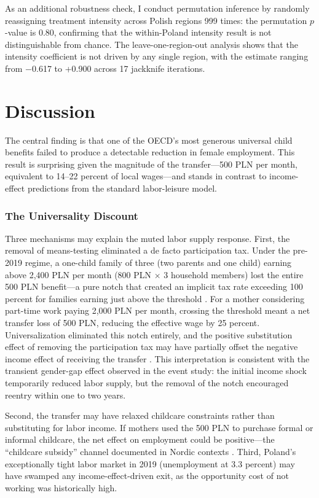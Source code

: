 \documentclass[12pt]{article}
\begin{document}
As an additional robustness check, I conduct permutation inference by randomly reassigning treatment intensity across Polish regions 999 times: the permutation $p$-value is 0.80, confirming that the within-Poland intensity result is not distinguishable from chance. The leave-one-region-out analysis shows that the intensity coefficient is not driven by any single region, with the estimate ranging from $-$0.617 to +0.900 across 17 jackknife iterations.




\section{Discussion}

The central finding is that one of the OECD's most generous universal child benefits failed to produce a detectable reduction in female employment. This result is surprising given the magnitude of the transfer---500 PLN per month, equivalent to 14--22 percent of local wages---and stands in contrast to income-effect predictions from the standard labor-leisure model.

\subsubsection*{The Universality Discount}  Three mechanisms may explain the muted labor supply response. First, the removal of means-testing eliminated a de facto participation tax. Under the pre-2019 regime, a one-child family of three (two parents and one child) earning above 2,400 PLN per month (800 PLN $\times$ 3 household members) lost the entire 500 PLN benefit---a pure notch that created an implicit tax rate exceeding 100 percent for families earning just above the threshold \citep{kleven2016}. For a mother considering part-time work paying 2,000 PLN per month, crossing the threshold meant a net transfer loss of 500 PLN, reducing the effective wage by 25 percent. Universalization eliminated this notch entirely, and the positive substitution effect of removing the participation tax may have partially offset the negative income effect of receiving the transfer \citep{saez2002}. This interpretation is consistent with the transient gender-gap effect observed in the event study: the initial income shock temporarily reduced labor supply, but the removal of the notch encouraged reentry within one to two years.

Second, the transfer may have relaxed childcare constraints rather than substituting for labor income. If mothers used the 500 PLN to purchase formal or informal childcare, the net effect on employment could be positive---the ``childcare subsidy'' channel documented in Nordic contexts \citep{havnes2011}. Third, Poland's exceptionally tight labor market in 2019 (unemployment at 3.3 percent) may have swamped any income-effect-driven exit, as the opportunity cost of not working was historically high.
\end{document}
